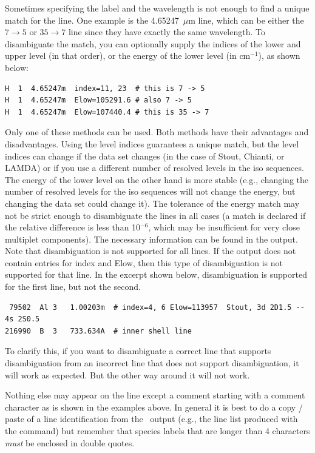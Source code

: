 Sometimes specifying the label and the wavelength is not enough to find a
unique match for the line. One example is the  4.65247~$\mu$m line,
which can be either the $7 \rightarrow 5$ or $35 \rightarrow 7$ line since
they have exactly the same wavelength. To disambiguate the match, you can
optionally supply the indices of the lower and upper level (in that order), or
the energy of the lower level (in cm$^{-1}$), as shown below:
\begin{verbatim}
H  1  4.65247m  index=11, 23  # this is 7 -> 5
H  1  4.65247m  Elow=105291.6 # also 7 -> 5
H  1  4.65247m  Elow=107440.4 # this is 35 -> 7
\end{verbatim}
Only one of these methods can be used. Both methods have their advantages and
disadvantages. Using the level indices guarantees a unique match, but the
level indices can change if the data set changes (in the case of Stout,
Chianti, or LAMDA) or if you use a different number of resolved levels in the
iso sequences. The energy of the lower level on the other hand is more stable
(e.g., changing the number of resolved levels for the iso sequences will not
change the energy, but changing the data set could change it). The tolerance
of the energy match may not be strict enough to disambiguate the lines in all
cases (a match is declared if the relative difference is less than 10$^{-6}$,
which may be insufficient for very close multiplet components). The necessary
information can be found in the  output. Note that
disambiguation is not supported for all lines. If the  output does not contain entries for index and Elow, then this type
of disambiguation is not supported for that line. In the excerpt shown below,
disambiguation is supported for the first line, but not the second.
\begin{verbatim}
 79502  Al 3   1.00203m  # index=4, 6 Elow=113957  Stout, 3d 2D1.5 -- 4s 2S0.5
216990  B  3   733.634A  # inner shell line
\end{verbatim}
To clarify this, if you want to disambiguate a correct line that supports
disambiguation from an incorrect line that does not support disambiguation, it
will work as expected. But the other way around it will not work.

Nothing else may appear on the line except a comment starting with a comment
character as is shown in the examples above. In general it is best to do a
copy / paste of a line identification from the \Cloudy\ output (e.g., the line
list produced with the  command) but remember that
species labels that are longer than 4 characters {\em must} be enclosed in
double quotes.

